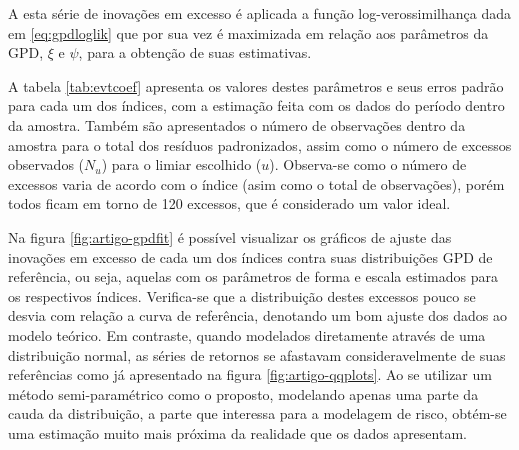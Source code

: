 \documentclass[review]{elsarticle}
\theoremstyle{definition}
\begin{document}
A esta série de inovações em excesso é aplicada a função log-verossimilhança dada em \eqref{eq:gpdloglik} que por sua vez é maximizada em relação aos parâmetros da GPD, $\xi$ e $\psi$, para a obtenção de suas estimativas.

A tabela \ref{tab:evtcoef} apresenta os valores destes parâmetros e seus erros padrão para cada um dos índices, com a estimação feita com os dados do período dentro da amostra. Também são apresentados o número de observações dentro da amostra para o total dos resíduos padronizados, assim como o número de excessos observados ($N_u$) para o limiar escolhido ($u$). Observa-se como o número de excessos varia de acordo com o índice (asim como o total de observações), porém todos ficam em torno de 120 excessos, que é considerado um valor ideal. 

	

Na figura \ref{fig:artigo-gpdfit} é possível visualizar os gráficos de ajuste das inovações em excesso de cada um dos índices contra suas distribuições GPD de referência, ou seja, aquelas com os parâmetros de forma e escala estimados para os respectivos índices. Verifica-se que a distribuição destes excessos pouco se desvia com relação a curva de referência, denotando um bom ajuste dos dados ao modelo teórico. Em contraste, quando modelados diretamente através de uma distribuição normal, as séries de retornos se afastavam consideravelmente de suas referências como já apresentado na figura \ref{fig:artigo-qqplots}. Ao se utilizar um método semi-paramétrico como o proposto, modelando apenas uma parte da cauda da distribuição, a parte que interessa para a modelagem de risco, obtém-se uma estimação muito mais próxima da realidade que os dados apresentam.
\end{document}
